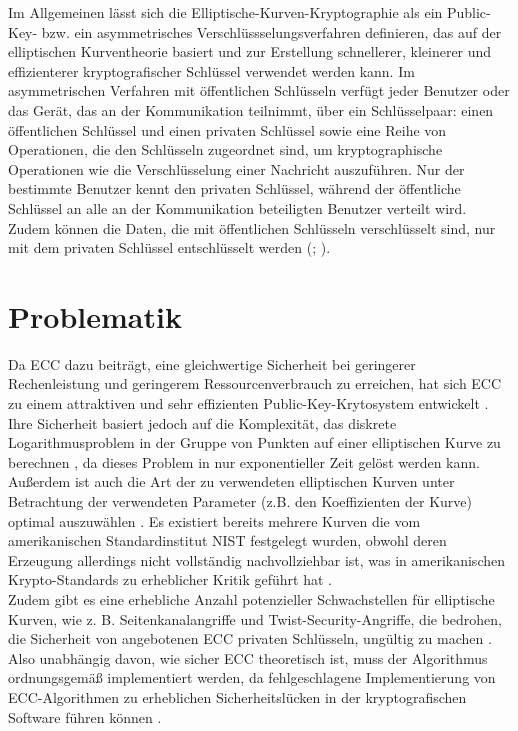 Im Allgemeinen lässt sich die Elliptische-Kurven-Kryptographie als ein Public-Key- bzw. ein asymmetrisches Verschlüssselungsverfahren definieren, das auf der elliptischen Kurventheorie basiert und zur Erstellung schnellerer, kleinerer und effizienterer kryptografischer Schlüssel verwendet werden kann.
Im asymmetrischen Verfahren mit öffentlichen Schlüsseln verfügt jeder Benutzer oder das Gerät, das an der Kommunikation teilnimmt, über ein Schlüsselpaar: einen öffentlichen Schlüssel und einen privaten Schlüssel sowie eine Reihe von Operationen, die den Schlüsseln zugeordnet sind, um kryptographische Operationen wie die Verschlüsselung einer Nachricht auszuführen. 
Nur der bestimmte Benutzer kennt den privaten Schlüssel, während der öffentliche Schlüssel an alle an der Kommunikation beteiligten Benutzer verteilt wird. 
Zudem können die Daten, die mit öffentlichen Schlüsseln verschlüsselt sind, nur mit dem privaten Schlüssel entschlüsselt werden (\cite{edoh}; \cite{razad}). 

\section{Problematik}


Da ECC dazu beiträgt, eine gleichwertige Sicherheit bei geringerer Rechenleistung und geringerem Ressourcenverbrauch zu erreichen, hat sich ECC zu einem attraktiven und sehr effizienten Public-Key-Krytosystem entwickelt \cite{sosax}. 
Ihre Sicherheit basiert jedoch auf die Komplexität, das diskrete Logarithmusproblem in der Gruppe von Punkten auf einer elliptischen Kurve zu berechnen \cite{BSI}, da dieses Problem in nur exponentieller Zeit gelöst werden kann. \\

Außerdem ist auch die Art der zu verwendeten elliptischen Kurven unter Betrachtung der verwendeten Parameter (z.B. den Koeffizienten der Kurve) optimal auszuwählen \cite{merLo}.
Es existiert bereits mehrere Kurven die vom amerikanischen Standardinstitut NIST festgelegt wurden, obwohl deren Erzeugung allerdings nicht vollständig nachvollziehbar ist, was in amerikanischen Krypto-Standards zu erheblicher Kritik geführt hat \cite{ securenet}. 
\\
Zudem gibt es eine erhebliche Anzahl potenzieller Schwachstellen für elliptische Kurven, wie z. B. Seitenkanalangriffe und Twist-Security-Angriffe, die bedrohen, die Sicherheit von angebotenen ECC privaten Schlüsseln, ungültig zu machen \cite{stolbikova}.
\\
Also unabhängig davon, wie sicher ECC theoretisch ist, muss der Algorithmus ordnungsgemäß implementiert werden, da fehlgeschlagene Implementierung von ECC-Algorithmen zu erheblichen Sicherheitslücken in der kryptografischen Software führen können \cite{stolbikova}. 

